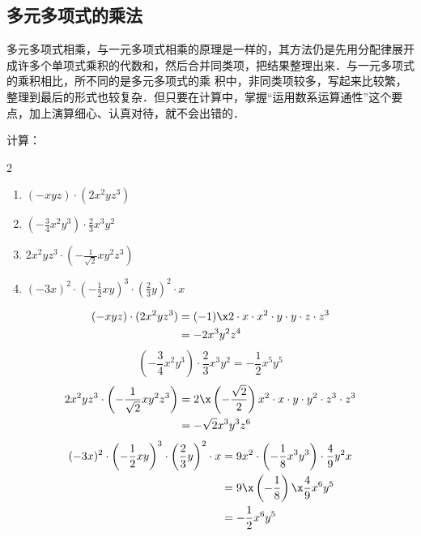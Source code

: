 \subsection{多元多项式的乘法}
多元多项式相乘，与一元多项式相乘的原理是一样的，其方法仍是先用分配律展开成许多个单项式乘积的代数和，然后合并同类项，把结果整理出来．与一元多项式的乘积相比，所不同的是多元多项式的乘
积中，非同类项较多，写起来比较繁，整理到最后的形式也较复杂．但只要在计算中，掌握“运用数系运算通性”这个要点，加上演算细心、认真对待，就不会出错的．

\begin{example}
    计算：
     \begin{multicols}{2}
\begin{enumerate}
    \item $(-xyz)\cdot (2x^2yz^3)$
    \item $\left(-\frac{3}{4}x^2y^3\right)\cdot \frac{2}{3}x^3y^2$
    \item $2x^2yz^3\cdot \left(-\frac{1}{\sqrt{2}}xy^2z^3\right)$
    \item $(-3x)^2\cdot \left(-\frac{1}{2}xy\right)^3\cdot \left(\frac{2}{3}y\right)^2\cdot x$
\end{enumerate}
\end{multicols}
\end{example}

\begin{solution}
\[\begin{split}
        (-xyz)\cdot (2x^2yz^3)&=(-1)\x 2\cdot x\cdot x^2\cdot y\cdot y\cdot z\cdot z^3\\
        &=-2x^3y^2z^4
    \end{split}\]
\[\left(-\frac{3}{4}x^2y^3\right)\cdot \frac{2}{3}x^3y^2=-\frac{1}{2}x^5y^5\]
 \[\begin{split}
       2x^2yz^3\cdot \left(-\frac{1}{\sqrt{2}}xy^2z^3\right)
&=2\x\left(-\frac{\sqrt{2}}{2}\right)x^2\cdot x\cdot y\cdot y^2\cdot z^3\cdot z^3\\
&=-\sqrt{2}x^3y^3z^6
    \end{split}\]
\[\begin{split}
       (-3x)^2\cdot \left(-\frac{1}{2}xy\right)^3\cdot \left(\frac{2}{3}y\right)^2\cdot x
        &=9x^2\cdot \left(-\frac{1}{8}x^3y^3\right)\cdot \frac{4}{9}y^2x\\
        &=9\x \left(-\frac{1}{8}\right)\x \frac{4}{9}x^6y^5\\
        &=-\frac{1}{2}x^6y^5
    \end{split}\]
\end{solution}

